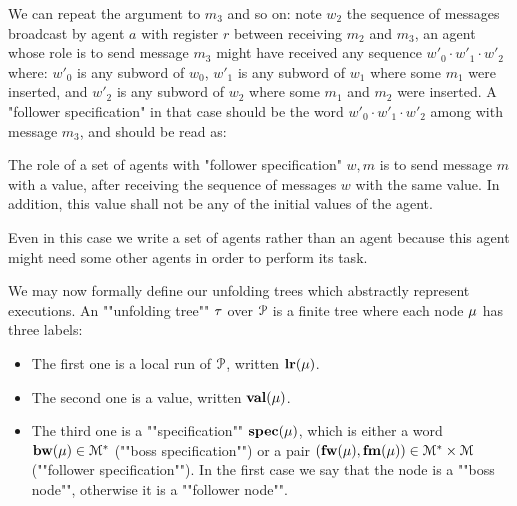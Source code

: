 We can repeat the argument to $m_3$ and so on: note $w_2$ the sequence of messages broadcast by agent $a$ with register $r$ between receiving $m_2$ and $m_3$, an agent whose role is to send message $m_3$ might have received any sequence $w'_0\cdot w'_1 \cdot w'_2$ where: $w'_0$ is any subword of $w_0$, $w'_1$ is any subword of $w_1$ where some $m_1$ were inserted, and $w'_2$ is any subword of $w_2$ where some $m_1$ and $m_2$ were inserted. A "follower specification" in that case should be the word $w'_0 \cdot w'_1 \cdot w'_2$ among with message $m_3$, and should be read as:
\begin{center}
		{The role of a set of agents with "follower specification" $w, m$ is to send message $m$ with a value, after receiving the sequence of messages $w$ with the same value. In addition, this value shall not be any of the initial values of the agent}.
\end{center}
Even in this case we write a set of agents rather than an agent because this agent might need some other agents in order to perform its task.
%
%


We may now formally define our unfolding trees which abstractly represent executions. 
\AP An ""unfolding tree"" $\tau$ over $\mathcal{P}$ is
a finite tree where each node $\mu$ has three labels:
\begin{itemize}
	\item The first one is a local run of $\mathcal{P}$, written $\mathbf{lr}(\mu)$. 
	
	\item The second one is a value, written $\mathbf{val}(\mu)$.
	
	\item The third one is a ""specification"" $\mathbf{spec}(\mu)$, which is either a word $\mathbf{bw}(\mu) \in \mathcal{M}^*$ (""boss specification"") or a pair $(\mathbf{fw}(\mu), \mathbf{fm}(\mu)) \in \mathcal{M}^* \times \mathcal{M}$ (""follower specification""). In the first case we say that the node is a ""boss node"", otherwise it is a ""follower node"".
\end{itemize} 

